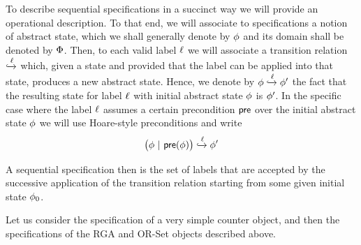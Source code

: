 To describe sequential specifications in a succinct way we will
provide an operational description.
To that end, we will associate to specifications a notion of abstract
state, which we shall generally denote by $\phi$ and its domain
shall be denoted by $\Phi$.
Then, to each valid label $\ell$ we will associate a transition
relation \;$\xhookrightarrow{\ensuremath{\ell}}$\; which, given a state and provided
that the label can be applied into that state, produces a new abstract
state.
Hence, we denote by $\phi \xhookrightarrow{\ensuremath{\ell}}  \phi'$
the fact that the resulting state for label $\ell$ with initial
abstract state $\phi$ is $\phi'$.
%
In the specific case where the label $\ell$ assumes a certain
precondition $\mathsf{pre}$ over the initial abstract state $\phi$ we
will use Hoare-style preconditions and write
\[ \big(\phi\ |\ \mathsf{pre}(\phi)\big) \xhookrightarrow{\ensuremath{\ell}}  \phi' \]

A sequential specification then is the set of labels that are accepted
by the successive application of the transition relation starting from
some given initial state $\phi_{0}$.




Let us consider the specification of a very simple counter object, and
then the specifications of the RGA and OR-Set objects described above.

